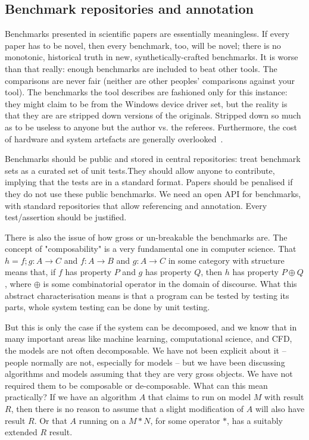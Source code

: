 \documentclass[conference]{IEEEtran}
\begin{document}
\subsection{Benchmark repositories and annotation}

Benchmarks presented in scientific papers are essentially
meaningless. If every paper has to be novel, then every benchmark,
too, will be novel; there is no monotonic, historical truth in new,
synthetically-crafted benchmarks. It is worse than that really: enough
benchmarks are included to beat other tools. The comparisons are never
fair (neither are other peoples' comparisons against your tool).  The
benchmarks the tool describes are fashioned only for this instance:
they might claim to be from the Windows device driver set, but the
reality is that they are are stripped down versions of the
originals. Stripped down so much as to be useless to anyone but the
author vs. the referees. Furthermore, the cost of hardware and system
artefacts are generally overlooked~\cite{brain+devos:2009}.

Benchmarks should be public and stored in central repositories: treat
benchmark sets as a curated set of unit tests.They should allow anyone
to contribute, implying that the tests are in a standard
format. Papers should be penalised if they do not use these public
benchmarks. We need an open API for benchmarks, with standard
repositories that allow referencing and annotation. Every
test/assertion should be justified.

There is also the issue of how gross or un-breakable the benchmarks are. 
The concept of "composability" is a very fundamental one in computer science. 
That $h = f;g : A \rightarrow C$ and $f : A \rightarrow B$ and $g : A \rightarrow C$ 
in some category with structure means that, if $f$ has property $P$ and $g$ has
property $Q$, then $h$ has property $P \oplus Q$, where $\oplus$ is some 
combinatorial operator in the domain of discourse. What this abstract 
characterisation means is that a program can be tested by testing its parts,
whole system testing can be done by unit testing. 

But this is only the case if the system can be decomposed, and we know
that in many important areas like machine learning, computational
science, and CFD, the models are not often decomposable.  We have not
been explicit about it -- people normally are not, especially for
models -- but we have been discussing algorithms and models assuming
that they are very gross objects. We have not required them to be
composable or de-composable. What can this mean practically? If we
have an algorithm $A$ that claims to run on model $M$ with result $R$,
then there is no reason to assume that a slight modification of $A$
will also have result $R$. Or that $A$ running on a $M * N$, for some
operator $*$, has a suitably extended $R$ result.
\end{document}
